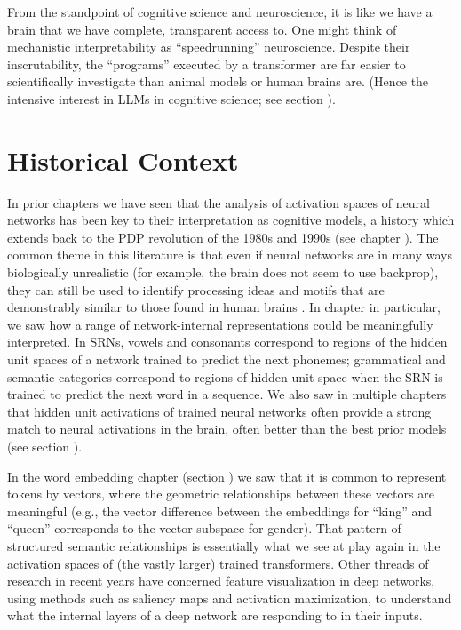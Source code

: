 From the standpoint of cognitive science and neuroscience, it is like we have a
brain that we have complete, transparent access to. One might think of
mechanistic interpretability as ``speedrunning'' neuroscience. Despite their
inscrutability, the ``programs'' executed by a transformer are far easier to
scientifically investigate than animal models or human brains are. (Hence the
intensive interest in LLMs in cognitive science; see section
).


\section{Historical Context}\label{mechInterpHist}

In prior chapters we have seen that the analysis of activation spaces of neural
networks has been key to their interpretation as cognitive models, a history
which extends back to the PDP revolution of the 1980s and 1990s (see chapter ). The common
theme in this literature is that even if neural networks are in many ways
biologically unrealistic (for example, the brain does not seem to use
backprop), they can still be used to identify processing ideas and motifs that
are demonstrably similar to those found in human brains
\cite{zipser1992identification}. In chapter  in
particular, we saw how a range of network-internal representations could be
meaningfully interpreted. In SRNs, vowels and consonants correspond to regions
of the hidden unit spaces of a network trained to predict the next phonemes;
grammatical and semantic categories correspond to regions of hidden unit space
when the SRN is trained to predict the next word in a sequence. We also saw in
multiple chapters that hidden unit activations of trained neural networks often
provide a strong match to neural activations in the brain, often better than
the best prior models (see section ).

In the word embedding chapter (section ) we saw
that it is common to represent tokens by vectors, where the geometric
relationships between these vectors are meaningful (e.g., the vector difference
between the embeddings for ``king'' and ``queen'' corresponds to the vector
subspace for gender). That pattern of structured semantic relationships is
essentially what we see at play again in the activation spaces of (the vastly
larger) trained transformers. Other threads of research in recent years have
concerned feature visualization in deep networks, using methods such as
saliency maps and activation maximization, to understand what the internal
layers of a deep network are responding to in their inputs.

